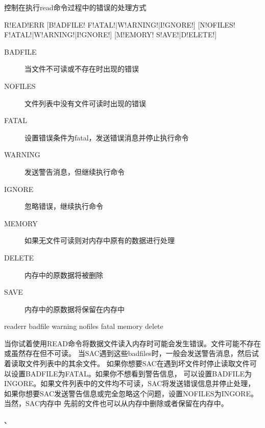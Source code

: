 \label{cmd:readerr}

控制在执行read命令过程中的错误的处理方式

\begin{SACSTX}
R!EAD!ERR [B!ADFILE! F!ATAL!|W!ARNING!|I!GNORE!] 
          [N!OFILES! F!ATAL!|W!ARNING!|I!GNORE!] 
          [M!EMORY! S!AVE!|D!ELETE!]
\end{SACSTX}

\begin{description}
\item [BADFILE] 当文件不可读或不存在时出现的错误 
\item [NOFILES] 文件列表中没有文件可读时出现的错误 
\item [FATAL] 设置错误条件为fatal，发送错误消息并停止执行命令 
\item [WARNING] 发送警告消息，但继续执行命令 
\item [IGNORE] 忽略错误，继续执行命令 
\item [MEMORY] 如果无文件可读则对内存中原有的数据进行处理 
\item [DELETE] 内存中的原数据将被删除 
\item [SAVE] 内存中的原数据将保留在内存中 
\end{description}

\begin{SACDFT}
readerr badfile warning nofiles fatal memory delete
\end{SACDFT}

当你试着使用READ命令将数据文件读入内存时可能会发生错误。文件可能不存在或虽然存在但不可读。
当SAC遇到这些badfiles时，一般会发送警告消息，然后试着读取文件列表中的其余文件。
如果你想要SAC在遇到坏文件时停止读取文件可以设置BADFILE为FATAL。如果你不想看到警告信息，
可以设置BADFILE为INGORE。如果文件列表中的文件均不可读，SAC将发送错误信息并停止处理，
如果你想要SAC发送警告信息或完全忽略这个问题，设置NOFILES为INGORE。当然，SAC内存中
先前的文件也可以从内存中删除或者保留在内存中。

、
